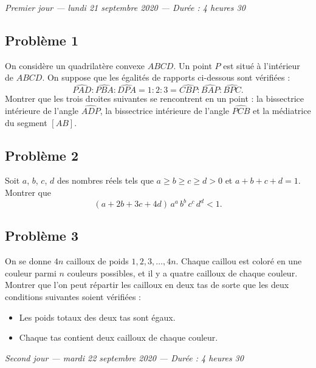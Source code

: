 
\begin{center}
  \emph{Premier jour --- lundi 21 septembre 2020 --- Durée : 4 heures 30}
\end{center}

\subsection*{Problème 1}
On considère un quadrilatère convexe $ABCD$. Un point $P$ est situé à
l'intérieur de $ABCD$. On suppose que les égalités de rapports ci-dessous
sont vérifiées :
\[
\widehat{PAD} : \widehat{PBA} : \widehat{DPA}
= 1 : 2 : 3 =
\widehat{CBP} : \widehat{BAP} : \widehat{BPC}.
\]
Montrer que les trois droites suivantes se rencontrent en un point : la
bissectrice intérieure de l'angle $\widehat{ADP}$, la bissectrice intérieure
de l'angle $\widehat{PCB}$ et la médiatrice du segment $[AB]$.

\subsection*{Problème 2}
Soit $a$, $b$, $c$, $d$ des nombres réels tels que $a \geqslant b \geqslant c
\geqslant d > 0$ et $a + b + c + d = 1$. Montrer que
\[
(a + 2b + 3c + 4d)\, a^{a}\, b^{b}\, c^{c}\, d^{d} < 1.
\]

\subsection*{Problème 3}
On se donne $4n$ cailloux de poids $1, 2, 3, \ldots, 4n$. Chaque caillou est
coloré en une couleur parmi $n$ couleurs possibles, et il y a quatre cailloux
de chaque couleur. Montrer que l'on peut répartir les cailloux en deux tas de
sorte que les deux conditions suivantes soient vérifiées :
\begin{itemize}
  \item Les poids totaux des deux tas sont égaux.
  \item Chaque tas contient deux cailloux de chaque couleur.
\end{itemize}

\bigskip
\begin{center}
  \emph{Second jour --- mardi 22 septembre 2020 --- Durée : 4 heures 30}
\end{center}


